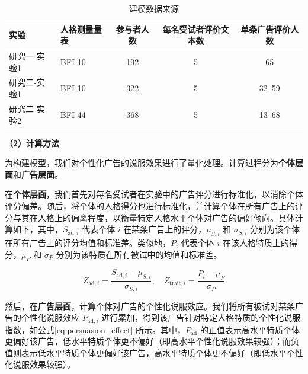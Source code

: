 \begin{table}[htbp]
    \centering
    \caption{\label{tab:model_data} 建模数据来源}
    {\tablesongti %
    \renewcommand{\arraystretch}{1.5} %
    \begin{tabular}{p{2cm} p{2cm} c c c} %
        \toprule
        \textbf{实验} & \textbf{人格测量量表} & \textbf{参与者人数} & \textbf{每名受试者评价文本数} & \textbf{单条广告评价人数} \\
        \midrule
        研究一-实验1 & BFI-10 & 192 & 5 & 65 \\
        研究二-实验1 & BFI-10 & 322 & 5 & 32--59 \\ %
        研究二-实验2 & BFI-44 & 368 & 5 & 13--68 \\ %
        \bottomrule
    \end{tabular}
    }
\end{table}




\textbf{（2）计算方法}
\label{calculationMethods}

为构建模型，我们对个性化广告的说服效果进行了量化处理。计算过程分为\textbf{个体层面}和\textbf{广告层面}。

在\textbf{个体层面}，我们首先对每名受试者在实验中的广告评分进行标准化，以消除个体评分偏差。随后，将个体的人格得分也进行标准化，并计算个体在所有广告上的评分与其在人格上的偏离程度，以衡量特定人格水平个体对广告的偏好倾向。具体计算如下，其中，\( S_{\text{ad},i} \) 代表个体 \( i \) 在某条广告上的评分，\( \mu_{S,i} \) 和 \( \sigma_{S,i} \) 分别为该个体在所有广告上的评分均值和标准差。类似地，\( P_{i} \) 代表个体 \( i \) 在该人格特质上的得分，\( \mu_{P} \) 和 \( \sigma_{P} \) 分别为该特质在所有被试中的均值和标准差。

\begin{equation}
    Z_{\text{ad},i} = \frac{S_{\text{ad},i} - \mu_{S,i}}{\sigma_{S,i}}, \quad
    Z_{\text{trait},i} = \frac{P_{i} - \mu_{P}}{\sigma_{P}}
    \label{eq:standardization}
\end{equation}

然后，在\textbf{广告层面}，计算个体对广告的个性化说服效应。我们将所有被试对某条广告的个性化说服效应 \( P_{\text{ad},i} \) 进行累加，得到该广告针对特定人格特质的个性化说服指数，如公式\eqref{eq:persuasion_effect} 所示。其中，\( P_{\text{ad}} \) 的正值表示高水平特质个体更偏好该广告，低水平特质个体更不偏好（即高水平个性化说服效果较强）；而负值则表示低水平特质个体更偏好该广告，高水平特质个体更不偏好（即低水平个性化说服效果较强）。

